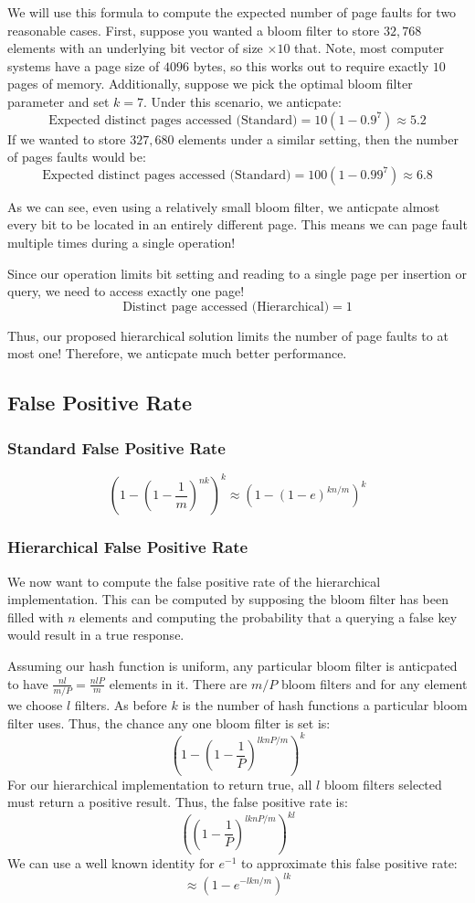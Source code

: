 We will use this formula to compute the expected number of page faults for two reasonable cases.
First, suppose you wanted a bloom filter to store $32,768$ elements with an underlying bit vector of size $\times 10$ that.
Note, most computer systems have a page size of $4096$ bytes, so this works out to require exactly $10$ pages of memory.
Additionally, suppose we pick the optimal bloom filter parameter and set $k=7$.
Under this scenario, we anticpate:
$$\text{Expected distinct pages accessed (Standard)} = 10(1-0.9^7) \approx 5.2$$
If we wanted to store $327,680$ elements under a similar setting, then the number of pages faults would be:
$$\text{Expected distinct pages accessed (Standard)} = 100(1-0.99^7) \approx 6.8$$

As we can see, even using a relatively small bloom filter, we anticpate almost every bit to be located in an entirely different page.
This means we can page fault multiple times during a single operation!

Since our operation limits bit setting and reading to a single page per insertion or query, we need to access exactly one page!
$$\text{Distinct page accessed (Hierarchical)} = 1$$

Thus, our proposed hierarchical solution limits the number of page faults to at most one!
Therefore, we anticpate much better performance.
\subsection{False Positive Rate}

\subsubsection{Standard False Positive Rate}

\begin{equation}
    (1 - (1 - \frac{1}{m})^{nk})^k \approx (1 - (1 - e)^{kn/m})^k
\end{equation}


\subsubsection{Hierarchical False Positive Rate}
We now want to compute the false positive rate of the hierarchical implementation.
This can be computed by supposing the bloom filter has been filled with $n$ elements and computing the probability that a querying a false key would result in a true response.

Assuming our hash function is uniform, any particular bloom filter is anticpated to have $\frac{nl}{m/P} = \frac{nlP}{m} $ elements in it.
There are $m/P$ bloom filters and for any element we choose $l$ filters. As before $k$ is the number of hash functions a particular bloom filter uses.
Thus, the chance any one bloom filter is set is:
$$(1-(1 - \frac{1}{P})^{lknP/m})^k$$
For our hierarchical implementation to return true, all $l$ bloom filters selected must return a positive result.
Thus, the false positive rate is:
$$((1 - \frac{1}{P})^{lknP/m})^{kl}$$
We can use a well known identity for $e^{-1}$ to approximate this false positive rate:
$$\approx (1 - e^{-lkn/m})^{lk}$$

